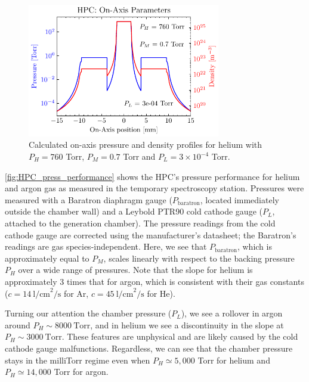 \begin{figure}
	\centering
	\includegraphics[width=0.75\textwidth]{figures/chap3/HPC_on-axis-pressure.pdf}
	\caption{Calculated on-axis pressure and density profiles for helium with $P_H = 760$ Torr, $P_M = 0.7$ Torr and $P_L = 3 \times 10^{-4}$ Torr.}
	\label{fig:HPC_on-axis-pressure}
\end{figure}

\cref{fig:HPC_press_performance} shows the HPC's pressure performance for helium and argon gas as measured in the temporary spectroscopy station. Pressures were measured with a Baratron diaphragm gauge ($P_{\textrm{baratron}}$, located immediately outside the chamber wall) and a Leybold PTR90 cold cathode gauge ($P_L$, attached to the generation chamber). The pressure readings from the cold cathode gauge are corrected using the manufacturer's datasheet; the Baratron's readings are gas species-independent. Here, we see that $P_{\textrm{baratron}}$, which is approximately equal to $P_M$, scales linearly with respect to the backing pressure $P_H$ over a wide range of pressures. Note that the slope for helium is approximately 3 times that for argon, which is consistent with their gas constants ($c=14 \ \textrm{l/cm}^2\textrm{/s}$ for Ar, $c=45 \ \textrm{l/cm}^2\textrm{/s}$ for He).

Turning our attention the chamber pressure ($P_L$), we see a rollover in argon around $P_H \sim 8000 \ \textrm{Torr}$, and in helium we see a discontinuity in the slope at $P_H \sim 3000 \ \textrm{Torr}$. These features are unphysical and are likely caused by the cold cathode gauge malfunctions. Regardless, we can see that the chamber pressure stays in the milliTorr regime even when $P_H \simeq 5,000$ Torr for helium and $P_H \simeq 14,000$ Torr for argon.

